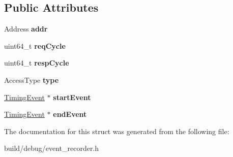 \subsection*{Public Attributes}
\begin{DoxyCompactItemize}
\item 
\hypertarget{structTimingRecord_aa06a3efbbb07642ab0398ba5a1680571}{Address {\bfseries addr}}\label{structTimingRecord_aa06a3efbbb07642ab0398ba5a1680571}

\item 
\hypertarget{structTimingRecord_abbce0ebeaa53e58ae4d2a29baa3e3d3a}{uint64\-\_\-t {\bfseries req\-Cycle}}\label{structTimingRecord_abbce0ebeaa53e58ae4d2a29baa3e3d3a}

\item 
\hypertarget{structTimingRecord_a1e5ddb675156fdc4e0ab4b5790727893}{uint64\-\_\-t {\bfseries resp\-Cycle}}\label{structTimingRecord_a1e5ddb675156fdc4e0ab4b5790727893}

\item 
\hypertarget{structTimingRecord_a5ad9028ae5f2dc46c4da25df0e116c6d}{Access\-Type {\bfseries type}}\label{structTimingRecord_a5ad9028ae5f2dc46c4da25df0e116c6d}

\item 
\hypertarget{structTimingRecord_aaab8dedaf865a6b112a3e857a1e39be4}{\hyperlink{classTimingEvent}{Timing\-Event} $\ast$ {\bfseries start\-Event}}\label{structTimingRecord_aaab8dedaf865a6b112a3e857a1e39be4}

\item 
\hypertarget{structTimingRecord_a9d76a2219fdc204a5cd8c539467be612}{\hyperlink{classTimingEvent}{Timing\-Event} $\ast$ {\bfseries end\-Event}}\label{structTimingRecord_a9d76a2219fdc204a5cd8c539467be612}

\end{DoxyCompactItemize}


The documentation for this struct was generated from the following file\-:\begin{DoxyCompactItemize}
\item 
build/debug/event\-\_\-recorder.\-h\end{DoxyCompactItemize}
